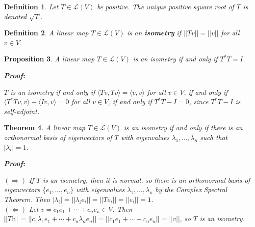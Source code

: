 \documentclass{article}
\theoremstyle{colontheorem}
\newtheorem{theorem}{Theorem}[section]
\newtheorem{proposition}[theorem]{Proposition}
\newtheorem{definition}[theorem]{Definition}
\newenvironment{Theorem}
{
	\begin{mdframed}[backgroundcolor=TheoremOrange!10]
	\begin{theorem}
}
{
	\end{theorem}
	\end{mdframed}
	
	\vspace{.15in}
}
\newenvironment{Proposition}
{
	\begin{mdframed}[backgroundcolor=PropPink!10]
	\begin{proposition}
}
{
	\end{proposition}
	\end{mdframed}
	
	\vspace{.15in}
}
\newenvironment{Def}
{
	\begin{mdframed}[backgroundcolor=DefGreen!10]
	\begin{definition}
}
{
	\end{definition}
	\end{mdframed}
	
	\vspace{.15in}
}
\newenvironment{Proof}
{
	\begin{mdframed}[backgroundcolor=ProofPurple!10]
	\textbf{Proof:}%
}
{
	\end{mdframed}
	
	\vspace{.085in}
}
\begin{document}
\begin{Def}
	
	Let $T \in \mathcal{L}(V)$ be positive. The unique positive square root of $T$ is denoted $\sqrt{T}$.
	
\end{Def}



\begin{Def}
	
	A linear map $T \in \mathcal{L}(V)$ is an \textbf{isometry} if $||Tv|| = ||v||$ for all $v \in V$.
	
\end{Def}



\begin{Proposition}
	
	A linear map $T \in \mathcal{L}(V)$ is an isometry if and only if $T^* T = I$.
	
	\begin{Proof}
		$T$ is an isometry if and only if $\langle Tv, Tv \rangle = \langle v, v \rangle$ for all $v \in V$, if and only if $\langle T^* T v, v \rangle - \langle Iv, v \rangle = 0$ for all $v \in V$, if and only if $T^* T - I = 0$, since $T^* T - I$ is self-adjoint.
		
	\end{Proof}
	
\end{Proposition}



\begin{Theorem}
	
	A linear map $T \in \mathcal{L}(V)$ is an isometry if and only if there is an orthonormal basis of eigenvectors of $T$ with eigenvalues $\lambda_1, ..., \lambda_n$ such that $|\lambda_i| = 1$.
	
	\begin{Proof}
		$(\Rightarrow)$ If $T$ is an isometry, then it is normal, so there is an orthonormal basis of eigenvectors $\{e_1, ..., e_n\}$ with eigenvalues $\lambda_1, ..., \lambda_n$ by the Complex Spectral Theorem. Then $|\lambda_i| = ||\lambda_i e_i|| = ||Te_i|| = ||e_i|| = 1$.\\
		
		$(\Leftarrow)$ Let $v = c_1 e_1 + \cdots + c_n e_n \in V$. Then $||Tv|| = ||c_1 \lambda_1 e_1 + \cdots + c_n \lambda_n e_n|| = ||c_1 e_1 + \cdots + c_n e_n|| = ||v||$, so $T$ is an isometry.
		
	\end{Proof}
	
\end{Theorem}
\end{document}
